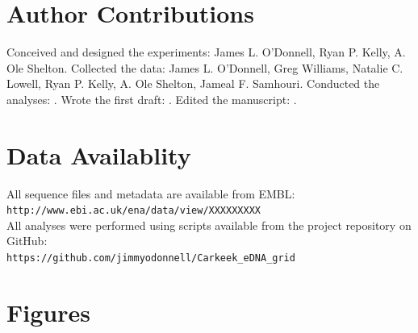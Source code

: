\documentclass[11pt,letterpaper]{article} %
\begin{document}
{%
\section*{Author Contributions}
Conceived and designed the experiments: James L. O'Donnell, Ryan P. Kelly, A. Ole Shelton.
Collected the data: James L. O'Donnell, Greg Williams, Natalie C. Lowell, Ryan P. Kelly, A. Ole Shelton, Jameal F. Samhouri.
Conducted the analyses: .
Wrote the first draft: .
Edited the manuscript: .


\section*{Data Availablity}
All sequence files and metadata are available from EMBL:\\ \verb!http://www.ebi.ac.uk/ena/data/view/XXXXXXXXX! \\
All analyses were performed using scripts available from the project repository on GitHub:\\  \verb!https://github.com/jimmyodonnell/Carkeek_eDNA_grid!\\


\section*{Figures}

}
\end{document}
